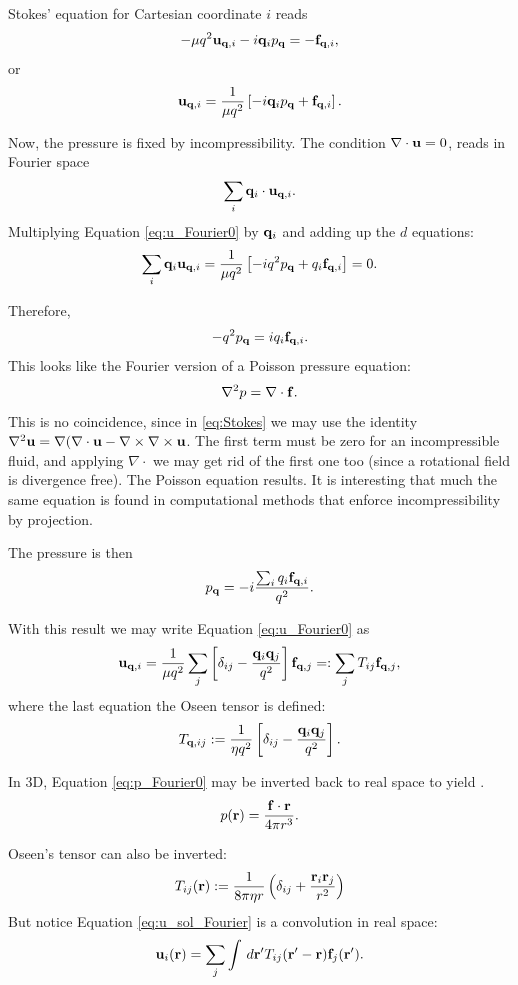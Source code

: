 Stokes' equation for Cartesian coordinate $i$ reads
\cite{bray2002theory}
\[
-\mu q^2 \mathbf{u}_{\mathbf{q},i} - i \mathbf{q}_i p_{\mathbf{q}} = - \mathbf{f}_{\mathbf{q},i} ,
\]
or
\begin{equation}
\label{eq:u_Fourier0}
\mathbf{u}_{\mathbf{q},i} = \frac 1{\mu q^2}
\left[
  - i \mathbf{q}_i p_{\mathbf{q}} + \mathbf{f}_{\mathbf{q},i} 
\right] .
\end{equation}

Now, the pressure is fixed by incompressibility. The condition
$\nabla\cdot\mathbf{u}=0$, reads in Fourier space
\[
  \sum_i\mathbf{q}_i\cdot\mathbf{u}_{\mathbf{q},i} .
\]
Multiplying Equation \ref{eq:u_Fourier0} by $\mathbf{q}_i$ and adding up the
$d$ equations:
\[
\sum_i \mathbf{q}_i \mathbf{u}_{\mathbf{q},i} = \frac 1{\mu q^2}
\left[
  - i q^2 p_{\mathbf{q}} + q_i\mathbf{f}_{\mathbf{q},i} 
\right] =0 .
\]

Therefore,
\[
  - q^2 p_{\mathbf{q}} = i q_i\mathbf{f}_{\mathbf{q},i}   .
\]
This looks like the Fourier version of a Poisson pressure equation:
\[
  \nabla^2 p = \nabla\cdot \mathbf{f} .
\]
This is no coincidence, since in \ref{eq:Stokes} we may use the
identity
\(\nabla^2 \mathbf{u} = \nabla(\nabla\cdot\mathbf{u} -
\nabla\times\nabla\times\mathbf{u} \). The first term must be zero for an
incompressible fluid, and applying $\nabla\cdot$ we may get rid of the
first one too (since a rotational field is divergence free). The
Poisson equation results. It is interesting that much the same
equation is found in computational methods that enforce
incompressibility by projection.

The pressure is then
\begin{equation}
\label{eq:p_Fourier0}
p_{\mathbf{q}} = -i \frac{\sum_i q_i\mathbf{f}_{\mathbf{q},i} }{q^2} .
\end{equation}

With this result we may write Equation \ref{eq:u_Fourier0} as
\begin{equation}
\label{eq:u_sol_Fourier}
\mathbf{u}_{\mathbf{q},i} = \frac 1{\mu q^2}
\sum_j
\left[ \delta_{ij} - \frac{ \mathbf{q}_i  \mathbf{q}_j}{q^2} \right]
\mathbf{f}_{\mathbf{q},j} =: \sum_j T_{ij} \mathbf{f}_{\mathbf{q},j},
\end{equation}
%
where the last equation the Oseen tensor is defined:
\[
T_{\mathbf{q},ij} := \frac 1{\eta q^2} \left[
  \delta_{ij} - \frac{ \mathbf{q}_i  \mathbf{q}_j}{q^2} 
\right].
\]

In 3D, Equation \ref{eq:p_Fourier0} may be inverted back to real space
to yield \cite{pozrikidis2011introduction}.
\[
p(\mathbf{r}) = \frac{\mathbf{f}\cdot\mathbf{r}}{4\pi r^3} .
\]

Oseen's tensor can also be inverted:
\[
T_{ij}(\mathbf{r}) :=  \frac 1{8\pi \eta r} 
\left(
  \delta_{ij} + \frac{ \mathbf{r}_i  \mathbf{r}_j}{r^2}
\right)
\]
But notice Equation \ref{eq:u_sol_Fourier} is a convolution in
real space:
\begin{equation}
\label{eq:u_sol_real}
\mathbf{u}_i(\mathbf{r}) =  \sum_j \int \,d\mathbf{r}' T_{ij}(\mathbf{r}'-\mathbf{r}) \mathbf{f}_j(\mathbf{r}') .
\end{equation}

